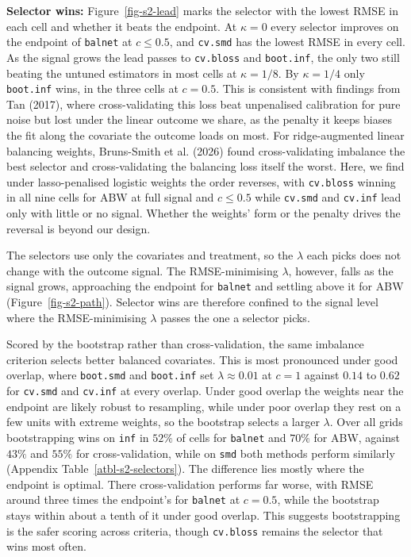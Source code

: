 \documentclass[
  12pt,
  a4paper,
]{article}
\begin{document}
\textbf{Selector wins:} Figure~\ref{fig-s2-lead} marks the selector with
the lowest RMSE in each cell and whether it beats the endpoint. At
\(\kappa = 0\) every selector improves on the endpoint of
\texttt{balnet} at \(c \le 0.5\), and \texttt{cv.smd} has the lowest
RMSE in every cell. As the signal grows the lead passes to
\texttt{cv.bloss} and \texttt{boot.inf}, the only two still beating the
untuned estimators in most cells at \(\kappa = 1/8\). By
\(\kappa = 1/4\) only \texttt{boot.inf} wins, in the three cells at
\(c = 0.5\). This is consistent with findings from Tan (2017), where
cross-validating this loss beat unpenalised calibration for pure noise
but lost under the linear outcome we share, as the penalty it keeps
biases the fit along the covariate the outcome loads on most. For
ridge-augmented linear balancing weights, Bruns-Smith et al. (2026)
found cross-validating imbalance the best selector and cross-validating
the balancing loss itself the worst. Here, we find under lasso-penalised
logistic weights the order reverses, with \texttt{cv.bloss} winning in
all nine cells for ABW at full signal and \(c \le 0.5\) while
\texttt{cv.smd} and \texttt{cv.inf} lead only with little or no signal.
Whether the weights' form or the penalty drives the reversal is beyond
our design.

The selectors use only the covariates and treatment, so the \(\lambda\)
each picks does not change with the outcome signal. The RMSE-minimising
\(\lambda\), however, falls as the signal grows, approaching the
endpoint for \texttt{balnet} and settling above it for ABW
(Figure~\ref{fig-s2-path}). Selector wins are therefore confined to the
signal level where the RMSE-minimising \(\lambda\) passes the one a
selector picks.

Scored by the bootstrap rather than cross-validation, the same imbalance
criterion selects better balanced covariates. This is most pronounced
under good overlap, where \texttt{boot.smd} and \texttt{boot.inf} set
\(\lambda \approx 0.01\) at \(c = 1\) against \(0.14\) to \(0.62\) for
\texttt{cv.smd} and \texttt{cv.inf} at every overlap. Under good overlap
the weights near the endpoint are likely robust to resampling, while
under poor overlap they rest on a few units with extreme weights, so the
bootstrap selects a larger \(\lambda\). Over all grids bootstrapping
wins on \texttt{inf} in \(52\%\) of cells for \texttt{balnet} and
\(70\%\) for ABW, against \(43\%\) and \(55\%\) for cross-validation,
while on \texttt{smd} both methods perform similarly
(Appendix Table~\ref{atbl-s2-selectors}). The difference lies mostly
where the endpoint is optimal. There cross-validation performs far
worse, with RMSE around three times the endpoint's for \texttt{balnet}
at \(c = 0.5\), while the bootstrap stays within about a tenth of it
under good overlap. This suggests bootstrapping is the safer scoring
across criteria, though \texttt{cv.bloss} remains the selector that wins
most often.
\end{document}
